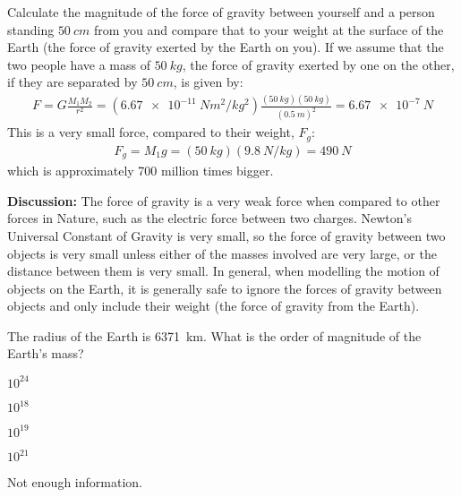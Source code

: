 \begin{example}{Calculate the magnitude of the force of gravity between yourself and a person standing $\SI{50}{cm}$ from you and compare that to your weight at the surface of the Earth (the force of gravity exerted by the Earth on you).}
If we assume that the two people have a mass of $\SI{50}{kg}$, the force of gravity exerted by one on the other, if they are separated by $\SI{50}{cm}$, is given by:
\begin{align*}
F=G\frac{M_1M_2}{r^2}=(\SI{6.67e-11}{Nm^2/kg^2})\frac{(\SI{50}{kg})(\SI{50}{kg})}{(\SI{0.5}{m})^2}=\SI{6.67e-7}{N}
\end{align*}
This is a very small force, compared to their weight, $F_g$:
\begin{align*}
F_g=M_1g=(\SI{50}{kg})(\SI{9.8}{N/kg})=\SI{490}{N}
\end{align*}
which is approximately 700 million times bigger. 

\textbf{Discussion:} The force of gravity is a very weak force when compared to other forces in Nature, such as the electric force between two charges. Newton's Universal Constant of Gravity is very small, so the force of gravity between two objects is very small unless either of the masses involved are very large, or the distance between them is very small. In general, when modelling the motion of objects on the Earth, it is generally safe to ignore the forces of gravity between objects and only include their weight (the force of gravity from the Earth). 
\end{example}

\begin{checkpoint}
\begin{MCquestion}{The radius of the Earth is \SI{6371}{km}. What is the order of magnitude of the Earth's mass?}
\item $10^{24}$
\item $10^{18}$
\item $10^{19}$
\item $10^{21}$
\item Not enough information.
\end{MCquestion}
\end{checkpoint}

